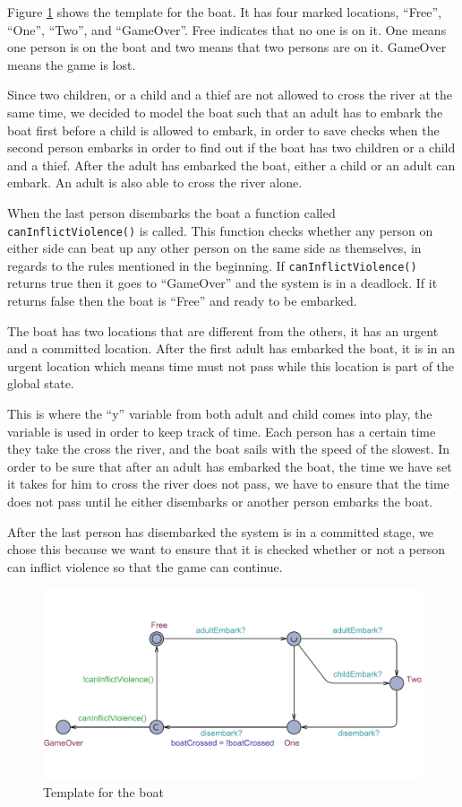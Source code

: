 \documentclass[a4paper,12pt]{article}
\begin{document}
Figure \ref{fig:boat} shows the template for the boat. It has four marked locations, ``Free'', ``One'', ``Two'', and ``GameOver''. Free indicates that no one is on it. One means one person is on the boat and two means that two persons are on it. GameOver means the game is lost. 

Since two children, or a child and a thief are not allowed to cross the river at the same time, we decided to model the boat such that an adult has to embark the boat first before a child is allowed to embark, in order to save checks when the second person embarks in order to find out if the boat has two children or a child and a thief. After the adult has embarked the boat, either a child or an adult can embark. An adult is also able to cross the river alone. 

When the last person disembarks the boat a function called \lstinline|canInflictViolence()| is called. This function checks whether any person on either side can beat up any other person on the same side as themselves, in regards to the rules mentioned in the beginning. If \lstinline|canInflictViolence()| returns true then it goes to ``GameOver'' and the system is in a deadlock. If it returns false then the boat is ``Free'' and ready to be embarked.

The boat has two locations that are different from the others, it has an urgent and a committed location. After the first adult has embarked the boat, it is in an urgent location which means time must not pass while this location is part of the global state. 

This is where the ``y'' variable from both adult and child comes into play, the variable is used in order to keep track of time. Each person has a certain time they take the cross the river, and the boat sails with the speed of the slowest. In order to be sure that after an adult has embarked the boat, the time we have set it takes for him to cross the river does not pass, we have to ensure that the time does not pass until he either disembarks or another person embarks the boat.

After the last person has disembarked the system is in a committed stage, we chose this because we want to ensure that it is checked whether or not a person can inflict violence so that the game can continue.

\begin{figure}[H]
\centering
\includegraphics[width=\linewidth]{Boat.pdf}
\caption{Template for the boat}
\label{fig:boat}
\end{figure}
\end{document}
